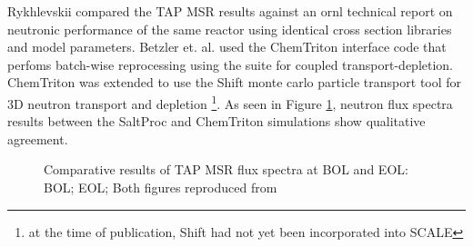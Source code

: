 
Rykhlevskii compared the TAP MSR results against an \Gls{ornl} technical report
on neutronic performance of the same reactor \cite{betzler_assessment_2017} using
identical cross section libraries and model parameters. Betzler et. al. used the
ChemTriton \cite{betzler_molten_2017} interface code that perfoms batch-wise
reprocessing using the \SCALE suite for coupled transport-depletion. ChemTriton
was extended to use the Shift \cite{davidson_nuclide_2018} monte carlo particle
transport tool for 3D neutron transport and depletion \footnote{at the time of
publication, Shift had not yet been incorporated into SCALE}. As seen in Figure
\ref{fig:tap-spectra}, neutron flux spectra results between the SaltProc and
ChemTriton simulations show qualitative agreement.

\begin{figure}[htpb]
    \centering
    \caption[Comparative results of TAP MSR flux spectra at BOL and EOL]{
        Comparative results of TAP MSR flux spectra at BOL and EOL:
         BOL;
         EOL;
        Both figures reproduced from \cite{rykhlevskii_fuel_2020}
    }
    \label{fig:tap-spectra}
\end{figure}

